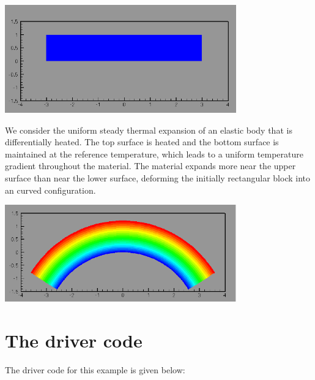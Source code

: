 
\begin{DoxyImage}
\includegraphics[width=0.75\textwidth]{undef}
\end{DoxyImage}


We consider the uniform steady thermal expansion of an elastic body that is differentially heated. The top surface is heated and the bottom surface is maintained at the reference temperature, which leads to a uniform temperature gradient throughout the material. The material expands more near the upper surface than near the lower surface, deforming the initially rectangular block into an curved configuration.

 
\begin{DoxyImage}
\includegraphics[width=0.75\textwidth]{def}
\end{DoxyImage}




 

 \hypertarget{index_main}{}\section{The driver code}\label{index_main}
The driver code for this example is given below\+:



